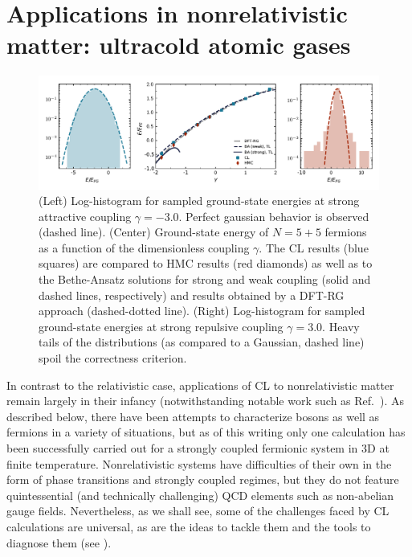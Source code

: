 \documentclass[../main.tex]{subfiles}
\begin{document}
\section{\label{sect:NRQFT}Applications in nonrelativistic matter: ultracold atomic gases}
%
\begin{figure}[t]
  \centering
  \includegraphics[width=\columnwidth]{./5applications-NREL/1d_bal_eos.pdf}
  \caption{\label{fig:1d_bal_eos}  (Left) Log-histogram for sampled ground-state energies at strong attractive coupling $\gamma = -3.0$. Perfect gaussian behavior is observed (dashed line). (Center) Ground-state energy of $N = 5 + 5$ fermions as a function of the dimensionless coupling $\gamma$. The CL results (blue squares) are compared to HMC results (red diamonds) as well as to the Bethe-Ansatz solutions for strong and weak coupling (solid and dashed lines, respectively) and results obtained by a DFT-RG approach \cite{0954-3899-44-1-015101} (dashed-dotted line). (Right) Log-histogram for sampled ground-state energies at strong repulsive coupling $\gamma = 3.0$. Heavy tails of the distributions (as compared to a Gaussian, dashed line) spoil the correctness criterion.}
\end{figure}
%

In contrast to the relativistic case, applications of CL to nonrelativistic matter remain largely in their infancy
(notwithstanding notable work such as Ref.~\cite{PRC2001026303}).
As described below, there have been attempts to characterize bosons as well as fermions in a variety of situations,
but as of this writing only one calculation has been successfully carried out for a strongly coupled fermionic system in 3D at finite temperature.
Nonrelativistic systems have difficulties of their own in the form of phase transitions and strongly coupled regimes, but they do not feature quintessential
(and technically challenging) QCD elements such as non-abelian gauge fields. Nevertheless, as we shall see, some of the challenges faced by CL calculations are
universal, as are the ideas to tackle them and the tools to diagnose them (see ).
\end{document}
